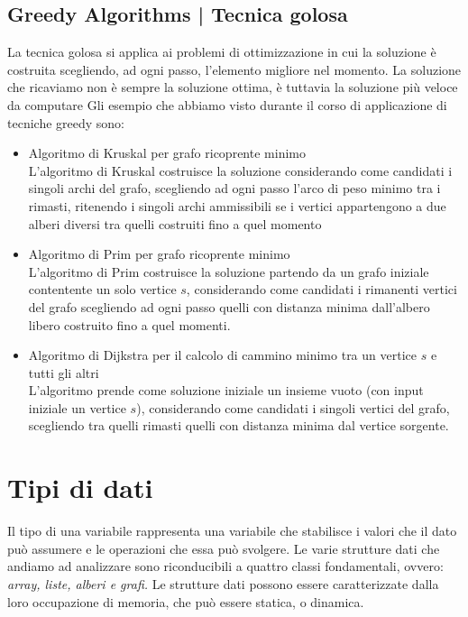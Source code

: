 \documentclass[11pt, oneside]{article}   	%
\begin{document}
\subsection{Greedy Algorithms | Tecnica golosa}
La tecnica golosa si applica ai problemi di ottimizzazione in cui la soluzione è costruita scegliendo, ad ogni passo, l'elemento migliore nel momento. La soluzione che ricaviamo non è sempre la soluzione ottima, è tuttavia la soluzione più veloce da computare
Gli esempio che abbiamo visto durante il corso di applicazione di tecniche greedy sono:
\begin{itemize}
\item Algoritmo di Kruskal per grafo ricoprente minimo\\
L'algoritmo di Kruskal costruisce la soluzione considerando come candidati i singoli archi del grafo, scegliendo ad ogni passo l'arco di peso minimo tra i rimasti, ritenendo i singoli archi ammissibili se i vertici appartengono a due alberi diversi tra quelli costruiti fino a quel momento
\item Algoritmo di Prim per grafo ricoprente minimo\\
L'algoritmo di Prim costruisce la soluzione partendo da un grafo iniziale contentente un solo vertice $s$, considerando come candidati i rimanenti vertici del grafo scegliendo ad ogni passo quelli con distanza minima dall'albero libero costruito fino a quel momenti.
\item Algoritmo di Dijkstra per il calcolo di cammino minimo tra un vertice $s$ e tutti gli altri\\
L'algoritmo prende come soluzione iniziale un insieme vuoto (con input iniziale un vertice $s$), considerando come candidati i singoli vertici del grafo, scegliendo tra quelli rimasti quelli con distanza minima dal vertice sorgente.
\end{itemize}




\section{Tipi di dati}
Il tipo di una variabile rappresenta una variabile che stabilisce i valori che il dato può assumere e le operazioni che essa può svolgere. Le varie strutture dati che andiamo ad analizzare sono riconducibili a quattro classi fondamentali, ovvero: \emph{array, liste, alberi e grafi.} Le strutture dati possono essere caratterizzate dalla loro occupazione di memoria, che può essere statica, o dinamica.
\end{document}
